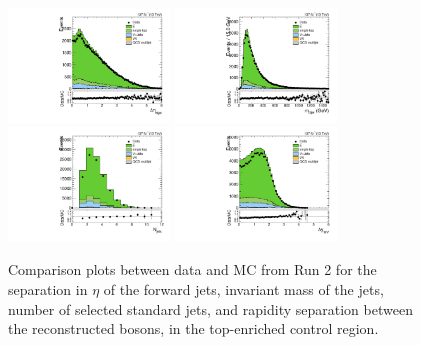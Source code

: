 \begin{figure}[htbp]
  \centering
  \includegraphics[width=0.3825\textwidth]{fig/controlPlots/CR_b1_allL_allP_allC_allD_Run2_lnujj_vbfDEta.pdf}
  \includegraphics[width=0.3825\textwidth]{fig/controlPlots/CR_b1_allL_allP_allC_allD_Run2_lnujj_vbfMass.pdf}\\
  \includegraphics[width=0.3825\textwidth]{fig/controlPlots/CR_b1_allL_allP_allC_allD_Run2_lnujj_nJets.pdf}
  \includegraphics[width=0.3825\textwidth]{fig/controlPlots/CR_b1_allL_allP_allC_allD_Run2_dy.pdf}\\
  \caption{
    Comparison plots between data and MC from Run 2 for the separation in $\eta$ of the \VBF forward jets, invariant mass of the \VBF jets, number of selected standard jets, and rapidity separation between the reconstructed bosons, in the top-enriched control region.
  }
  \label{fig:CR_controlPlotsRun2_4}
\end{figure}

